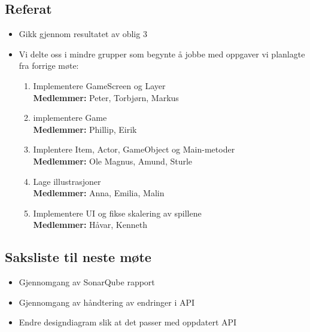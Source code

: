 \documentclass[11pt]{meetingmins}
\begin{document}
\maketitle

\subsection{Referat}
\begin{itemize}

\item Gikk gjennom resultatet av oblig 3
\item Vi delte oss i mindre grupper som begynte {\aa} jobbe med oppgaver vi planlagte fra forrige m{\o}te:
\begin{enumerate}

\item Implementere GameScreen og Layer \\
\textbf{Medlemmer:} Peter, Torbj{\o}rn, Markus

\item implementere Game \\
\textbf{Medlemmer:} Phillip, Eirik

\item Implentere Item, Actor, GameObject og Main-metoder \\
\textbf{Medlemmer:} Ole Magnus, Amund, Sturle

\item Lage illustrasjoner \\
\textbf{Medlemmer:} Anna, Emilia, Malin

\item Implementere UI og fikse skalering av spillene\\
\textbf{Medlemmer:} H{\aa}var, Kenneth

\end{enumerate}
\end{itemize}

\subsection{Saksliste til neste m{\o}te}
\begin{itemize}

\item Gjennomgang av SonarQube rapport
\item Gjennomgang av h{\aa}ndtering av endringer i API
\item Endre designdiagram slik at det passer med oppdatert API 

\end{itemize}

\end{document}
